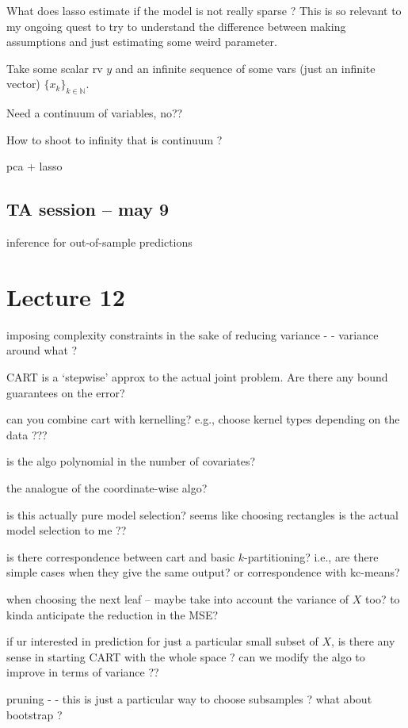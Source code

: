 \documentclass[a4paper,12pt,twoside]{article}
\begin{document}
What does lasso estimate if the model is not really sparse ?
This is so relevant to my ongoing quest to try to understand the difference between making assumptions and just estimating some weird parameter.

Take some scalar rv $y$ and an infinite sequence of some vars (just an infinite vector) $\{ x_k \}_{k \in \mathbb{N}}$.

Need a continuum of variables, no??


How to shoot to infinity that is continuum ?


pca + lasso



\subsection*{TA session -- may 9}

inference for out-of-sample predictions


\section*{Lecture 12}


imposing complexity constraints in the sake of reducing variance - - variance around what ?

CART is a `stepwise' approx to the actual joint problem.
Are there any bound guarantees on the error?


can you combine cart with kernelling? 
e.g., choose kernel types depending on the data ???

is the algo polynomial in the number of covariates?

the analogue of the coordinate-wise algo?


is this actually pure model selection? seems like choosing rectangles is the actual model selection to me ??


is there correspondence between cart and basic $k$-partitioning? i.e., are there simple cases when they give the same output? or correspondence with kc-means?


when choosing the next leaf -- maybe take into account the variance of $X$ too? to kinda anticipate the reduction in the MSE?

if ur interested in prediction for just a particular small subset of $X$, is there any sense in starting CART with the whole space ? can we modify the algo to improve in terms of variance ??

pruning - - this is just a particular way to choose subsamples ? what about bootstrap ?
\end{document}
